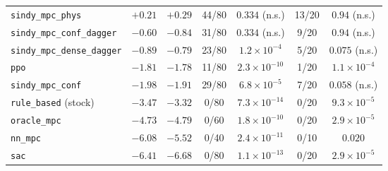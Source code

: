 \begin{table}[t]
\begin{tabular}{@{}lcccccc@{}}
\texttt{sindy\_mpc\_phys}         & $+0.21$ & $+0.29$ & 44/80 & $0.334$ (n.s.) & 13/20 & $0.94$ (n.s.) \\
\texttt{sindy\_mpc\_conf\_dagger} & $-0.60$ & $-0.84$ & 31/80 & $0.334$ (n.s.) & 9/20 & $0.94$ (n.s.) \\
\texttt{sindy\_mpc\_dense\_dagger}& $-0.89$ & $-0.79$ & 23/80 & $1.2\times10^{-4}$ & 5/20 & $0.075$ (n.s.) \\
\texttt{ppo}                      & $-1.81$ & $-1.78$ & 11/80 & $2.3\times10^{-10}$ & 1/20 & $1.1\times10^{-4}$ \\
\texttt{sindy\_mpc\_conf}         & $-1.98$ & $-1.91$ & 29/80 & $6.8\times10^{-5}$ & 7/20 & $0.058$ (n.s.) \\
\texttt{rule\_based} (stock)      & $-3.47$ & $-3.32$ & 0/80  & $7.3\times10^{-14}$ & 0/20 & $9.3\times10^{-5}$ \\
\texttt{oracle\_mpc}              & $-4.73$ & $-4.79$ & 0/60  & $1.8\times10^{-10}$ & 0/20 & $2.9\times10^{-5}$ \\
\texttt{nn\_mpc}                  & $-6.08$ & $-5.52$ & 0/40  & $2.4\times10^{-11}$ & 0/10 & $0.020$ \\
\texttt{sac}                      & $-6.41$ & $-6.68$ & 0/80  & $1.1\times10^{-13}$ & 0/20 & $2.9\times10^{-5}$ \\
\bottomrule
\end{tabular}
\end{table}

